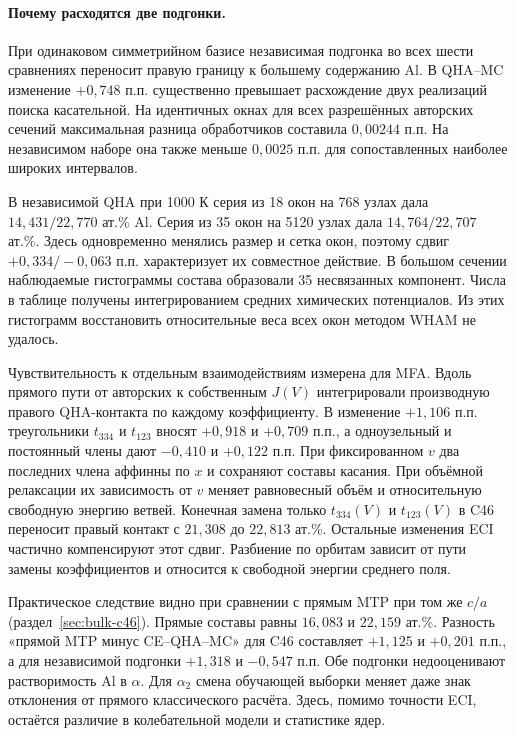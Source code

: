 \documentclass[11pt,a4paper]{article}
\begin{document}
\paragraph{Почему расходятся две подгонки.}
При одинаковом симметрийном базисе независимая подгонка во всех шести
сравнениях переносит правую границу к большему содержанию Al.
В QHA--MC изменение \(+0{,}748\) п.п. существенно превышает расхождение
двух реализаций поиска касательной. На идентичных окнах для всех
разрешённых авторских сечений максимальная разница обработчиков
составила \(0{,}00244\) п.п. На независимом наборе она также
меньше \(0{,}0025\) п.п. для сопоставленных наиболее широких интервалов.

В независимой QHA при 1000 К серия из 18 окон на 768 узлах дала
\(14{,}431/22{,}770\) ат.\% Al. Серия из 35 окон на 5120 узлах
дала \(14{,}764/22{,}707\) ат.\%. Здесь одновременно менялись размер
и сетка окон, поэтому сдвиг \(+0{,}334/-0{,}063\) п.п. характеризует
их совместное действие. В большом сечении наблюдаемые гистограммы
состава образовали 35 несвязанных компонент. Числа в таблице получены
интегрированием средних химических потенциалов. Из этих гистограмм
восстановить относительные веса всех окон методом WHAM не удалось.

Чувствительность к отдельным взаимодействиям измерена для MFA.
Вдоль прямого пути от авторских к собственным \(J(V)\) интегрировали
производную правого QHA-контакта по каждому коэффициенту.
В изменение \(+1{,}106\) п.п. треугольники \(t_{334}\) и \(t_{123}\)
вносят \(+0{,}918\) и \(+0{,}709\) п.п., а одноузельный и постоянный
члены дают \(-0{,}410\) и \(+0{,}122\) п.п. При фиксированном \(v\)
два последних члена аффинны по \(x\) и сохраняют составы касания.
При объёмной релаксации их зависимость от \(v\) меняет равновесный объём
и относительную свободную энергию ветвей. Конечная замена только
\(t_{334}(V)\) и \(t_{123}(V)\) в C46 переносит правый контакт
с \(21{,}308\) до \(22{,}813\) ат.\%. Остальные изменения ECI частично
компенсируют этот сдвиг. Разбиение по орбитам зависит от пути замены
коэффициентов и относится к свободной энергии среднего поля.

Практическое следствие видно при сравнении с прямым MTP при том же
\(c/a\) (раздел~\ref{sec:bulk-c46}). Прямые составы равны
\(16{,}083\) и \(22{,}159\) ат.\%. Разность «прямой MTP минус
CE--QHA--MC» для C46 составляет \(+1{,}125\) и \(+0{,}201\) п.п.,
а для независимой подгонки \(+1{,}318\) и \(-0{,}547\) п.п.
Обе подгонки недооценивают растворимость Al в \(\alpha\). Для
\(\alpha_2\) смена обучающей выборки меняет даже знак отклонения
от прямого классического расчёта. Здесь, помимо точности ECI, остаётся
различие в колебательной модели и статистике ядер.
\end{document}
